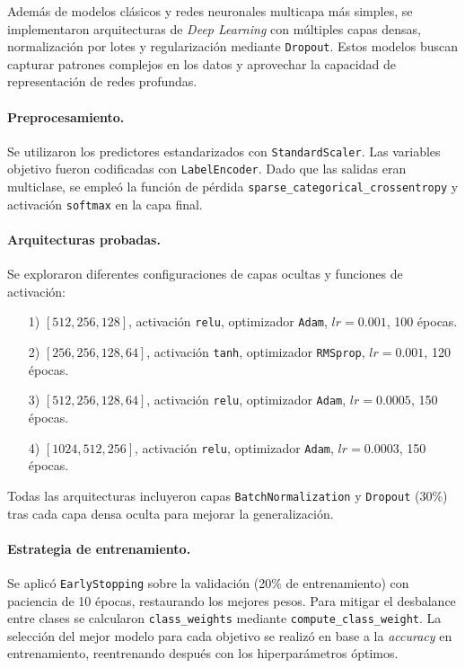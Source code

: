 \documentclass[11pt,a4paper,spanish]{book}
\numberwithin{equation}{chapter}
\numberwithin{figure}{chapter}
\begin{document}
Además de modelos clásicos y redes neuronales multicapa más simples, se implementaron 
arquitecturas de \textit{Deep Learning} con múltiples capas densas, normalización por lotes y 
regularización mediante \texttt{Dropout}. Estos modelos buscan capturar patrones complejos en 
los datos y aprovechar la capacidad de representación de redes profundas.

\paragraph{Preprocesamiento.}
Se utilizaron los predictores estandarizados con \texttt{StandardScaler}. 
Las variables objetivo fueron codificadas con \texttt{LabelEncoder}. 
Dado que las salidas eran multiclase, se empleó la función de pérdida 
\texttt{sparse\_categorical\_crossentropy} y activación \texttt{softmax} en la capa final.

\paragraph{Arquitecturas probadas.}
Se exploraron diferentes configuraciones de capas ocultas y funciones de activación:
\begin{itemize}
    \item [1)] $[512, 256, 128]$, activación \texttt{relu}, optimizador \texttt{Adam}, $lr=0.001$, 100 épocas.
    \item [2)] $[256, 256, 128, 64]$, activación \texttt{tanh}, optimizador \texttt{RMSprop}, $lr=0.001$, 120 épocas.
    \item [3)] $[512, 256, 128, 64]$, activación \texttt{relu}, optimizador \texttt{Adam}, $lr=0.0005$, 150 épocas.
    \item [4)] $[1024, 512, 256]$, activación \texttt{relu}, optimizador \texttt{Adam}, $lr=0.0003$, 150 épocas.
\end{itemize}
Todas las arquitecturas incluyeron capas \texttt{BatchNormalization} y \texttt{Dropout} (30\%) 
tras cada capa densa oculta para mejorar la generalización.

\paragraph{Estrategia de entrenamiento.}
Se aplicó \texttt{EarlyStopping} sobre la validación (20\% de entrenamiento) con paciencia de 10 épocas,
restaurando los mejores pesos. 
Para mitigar el desbalance entre clases se calcularon \texttt{class\_weights} mediante 
\texttt{compute\_class\_weight}. 
La selección del mejor modelo para cada objetivo se realizó en base a la \textit{accuracy} en entrenamiento,
reentrenando después con los hiperparámetros óptimos.
\end{document}
